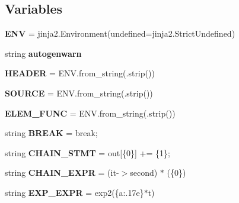 \subsection*{Variables}
\begin{DoxyCompactItemize}
\item 
\mbox{\label{namespacedecaygen_adb67ac7d20fa38139d16aeb73fe81551}} 
{\bfseries E\+NV} = jinja2.\+Environment(undefined=jinja2.\+Strict\+Undefined)
\item 
string {\bfseries autogenwarn}
\item 
\mbox{\label{namespacedecaygen_ac27265656055f92a90cc2c29370319b0}} 
{\bfseries H\+E\+A\+D\+ER} = E\+N\+V.\+from\+\_\+string(.strip())
\item 
\mbox{\label{namespacedecaygen_a1bbf7060b1842fccea26e974565b7fc3}} 
{\bfseries S\+O\+U\+R\+CE} = E\+N\+V.\+from\+\_\+string(.strip())
\item 
\mbox{\label{namespacedecaygen_ada7f55c790eb73ce276456c98a3d64eb}} 
{\bfseries E\+L\+E\+M\+\_\+\+F\+U\+NC} = E\+N\+V.\+from\+\_\+string(.strip())
\item 
\mbox{\label{namespacedecaygen_a08753ef88ec65af70e708cf824b1e841}} 
string {\bfseries B\+R\+E\+AK} = \textquotesingle{} break;\textquotesingle{}
\item 
\mbox{\label{namespacedecaygen_a5893c4ad03355bc4894f6b94e14626d9}} 
string {\bfseries C\+H\+A\+I\+N\+\_\+\+S\+T\+MT} = \textquotesingle{} out\mbox{[}\{0\}\mbox{]} += \{1\};\textquotesingle{}
\item 
\mbox{\label{namespacedecaygen_ad96ae69f060f308e4930853633236468}} 
string {\bfseries C\+H\+A\+I\+N\+\_\+\+E\+X\+PR} = \textquotesingle{}(it-\/$>$second) $\ast$ (\{0\})\textquotesingle{}
\item 
\mbox{\label{namespacedecaygen_a0eb244c63eafc1a6cd93d02cb8f49723}} 
string {\bfseries E\+X\+P\+\_\+\+E\+X\+PR} = \textquotesingle{}exp2(\{a\+:.\+17e\}$\ast$t)\textquotesingle{}
\item 
\mbox{\label{namespacedecaygen_a1a2219faac5fc5808f70487f0baff85b}} 

\end{DoxyCompactItemize}
